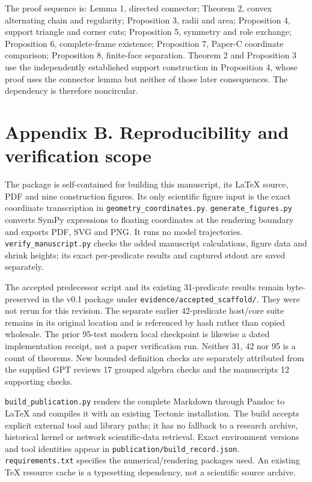 \documentclass[
  11pt,
  a4paper,
]{article}
\begin{document}
The proof sequence is: Lemma 1, directed connector; Theorem 2, convex alternating chain and regularity; Proposition 3, radii and area; Proposition 4, support triangle and corner cuts; Proposition 5, symmetry and role exchange; Proposition 6, complete-frame existence; Proposition 7, Paper-C coordinate comparison; Proposition 8, finite-face separation. Theorem 2 and Proposition 3 use the independently established support construction in Proposition 4, whose proof uses the connector lemma but neither of those later consequences. The dependency is therefore noncircular.

\section{Appendix B. Reproducibility and verification scope}\label{appendix-b.-reproducibility-and-verification-scope}

The package is self-contained for building this manuscript, its LaTeX source, PDF and nine construction figures. Its only scientific figure input is the exact coordinate transcription in \texttt{geometry\_coordinates.py}. \texttt{generate\_figures.py} converts SymPy expressions to floating coordinates at the rendering boundary and exports PDF, SVG and PNG. It runs no model trajectories. \texttt{verify\_manuscript.py} checks the added manuscript calculations, figure data and shrink heights; its exact per-predicate results and captured stdout are saved separately.

The accepted predecessor script and its existing 31-predicate results remain byte-preserved in the v0.1 package under \texttt{evidence/accepted\_scaffold/}. They were not rerun for this revision. The separate earlier 42-predicate host/core suite remains in its original location and is referenced by hash rather than copied wholesale. The prior 95-test modern local checkpoint is likewise a dated implementation receipt, not a paper verification run. Neither 31, 42 nor 95 is a count of theorems. New bounded definition checks are separately attributed from the supplied GPT review\textquotesingle s 17 grouped algebra checks and the manuscript\textquotesingle s 12 supporting checks.

\texttt{build\_publication.py} renders the complete Markdown through Pandoc to LaTeX and compiles it with an existing Tectonic installation. The build accepts explicit external tool and library paths; it has no fallback to a research archive, historical kernel or network scientific-data retrieval. Exact environment versions and tool identities appear in \texttt{publication/build\_record.json}. \texttt{requirements.txt} specifies the numerical/rendering packages used. An existing TeX resource cache is a typesetting dependency, not a scientific source archive.
\end{document}
